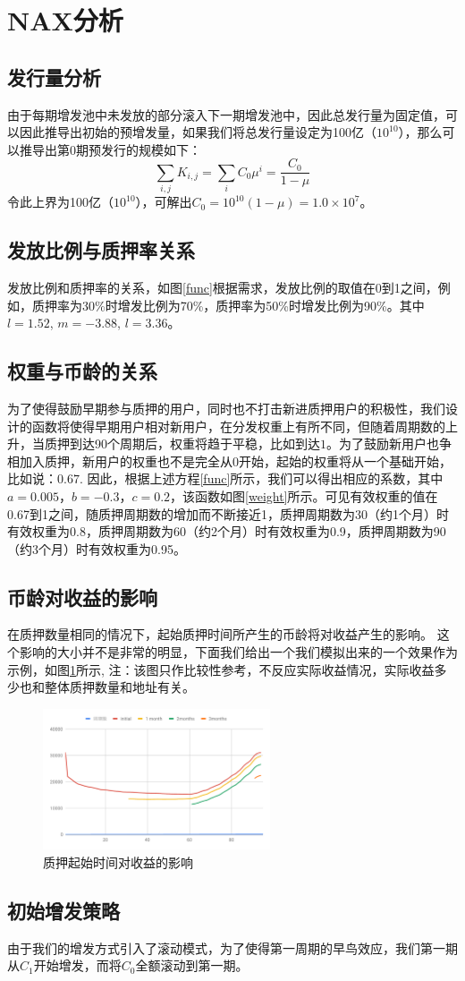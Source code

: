 \section{NAX分析}
\subsection{发行量分析}
由于每期增发池中未发放的部分滚入下一期增发池中，因此总发行量为固定值，可以因此推导出初始的预增发量，如果我们将总发行量设定为100亿（\(10^{10}\)），那么可以推导出第0期预发行的规模如下：
\begin{equation}
  \sum_{i,j} K_{i,j} = \sum_i C_0 \mu^i = \frac{C_0}{1-\mu}
\end{equation}
  令此上界为100亿（\(10^{10}\)），可解出\(C_0 = 10^{10}(1-\mu) = 1.0\times10^7\)。

\subsection{发放比例与质押率关系}
发放比例和质押率的关系，如图\ref{func}根据需求，发放比例的取值在0到1之间，例如，质押率为30\%时增发比例为70\%，质押率为50\%时增发比例为90\%。其中\(l=1.52\), \(m=-3.88\), \(l=3.36\)。

\subsection{权重与币龄的关系}
为了使得鼓励早期参与质押的用户，同时也不打击新进质押用户的积极性，我们设计的函数将使得早期用户相对新用户，在分发权重上有所不同，但随着周期数的上升，当质押到达90个周期后，权重将趋于平稳，比如到达$1$。为了鼓励新用户也争相加入质押，新用户的权重也不是完全从0开始，起始的权重将从一个基础开始，比如说：$0.67$. 因此，根据上述方程\ref{func}所示，我们可以得出相应的系数，其中\(a=0.005\)，\(b=-0.3\)，\(c=0.2\)，该函数如图\ref{weight}所示。可见有效权重的值在0.67到1之间，随质押周期数的增加而不断接近1，质押周期数为30（约1个月）时有效权重为0.8，质押周期数为60（约2个月）时有效权重为0.9，质押周期数为90（约3个月）时有效权重为0.95。

\subsection{币龄对收益的影响}
在质押数量相同的情况下，起始质押时间所产生的币龄将对收益产生的影响。 这个影响的大小并不是非常的明显，下面我们给出一个我们模拟出来的一个效果作为示例，如图\ref{fig:compare}所示, 注：该图只作比较性参考，不反应实际收益情况，实际收益多少也和整体质押数量和地址有关。
\begin{figure}[htbp]
  \centering
    \includegraphics[width=0.6\textwidth]{../common/zh/compare.pdf}
    \caption{质押起始时间对收益的影响 \label{fig:compare}}
\end{figure}

\subsection{初始增发策略}
由于我们的增发方式引入了滚动模式，为了使得第一周期的早鸟效应，我们第一期从$C_1$开始增发，而将$C_0$全额滚动到第一期。

